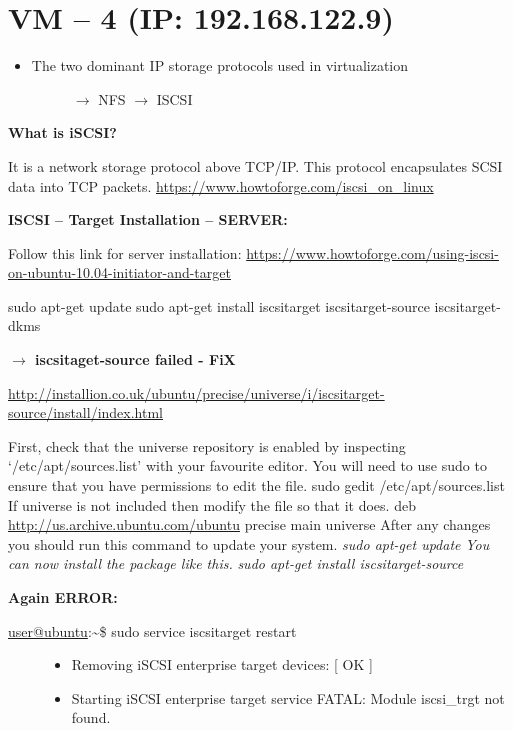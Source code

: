\documentclass[letterpaper,10pt,english]{sphinxmanual}
\begin{document}
\section{VM – 4 (IP: 192.168.122.9)}
\label{week-13:vm-4-ip-192-168-122-9}\begin{itemize}
\item {} \begin{description}
\item[{The two dominant IP storage protocols used in virtualization}] \leavevmode
\(\rightarrow\) NFS
\(\rightarrow\) ISCSI

\end{description}

\end{itemize}

\textbf{What is iSCSI?}

It is a network storage protocol above TCP/IP. This protocol encapsulates SCSI data into TCP packets.
\href{https://www.howtoforge.com/iscsi\_on\_linux}{https://www.howtoforge.com/iscsi\_on\_linux}

\textbf{ISCSI – Target Installation – SERVER:}

Follow this link for server installation:
\href{https://www.howtoforge.com/using-iscsi-on-ubuntu-10.04-initiator-and-target}{https://www.howtoforge.com/using-iscsi-on-ubuntu-10.04-initiator-and-target}

sudo apt-get update
sudo apt-get install iscsitarget iscsitarget-source iscsitarget-dkms

\textbf{\(\rightarrow\) iscsitaget-source failed -  FiX}

\href{http://installion.co.uk/ubuntu/precise/universe/i/iscsitarget-source/install/index.html}{http://installion.co.uk/ubuntu/precise/universe/i/iscsitarget-source/install/index.html}

First, check that the universe repository is enabled by inspecting `/etc/apt/sources.list' with your favourite editor.
You will need to use sudo to ensure that you have permissions to edit the file.
sudo gedit /etc/apt/sources.list
If universe is not included then modify the file so that it does.
deb \href{http://us.archive.ubuntu.com/ubuntu}{http://us.archive.ubuntu.com/ubuntu} precise main universe
After any changes you should run this command to update your system.
\emph{sudo apt-get update}
\emph{You can now install the package like this.}
\emph{sudo apt-get install iscsitarget-source}

\textbf{Again ERROR:}
\begin{description}
\item[{\href{mailto:user@ubuntu}{user@ubuntu}:\textasciitilde{}\$ sudo service iscsitarget restart}] \leavevmode\begin{itemize}
\item {} 
Removing iSCSI enterprise target devices:           {[} OK {]}

\item {} 
Starting iSCSI enterprise target service            FATAL: Module iscsi\_trgt not found.

\end{itemize}

\end{description}
\end{document}
